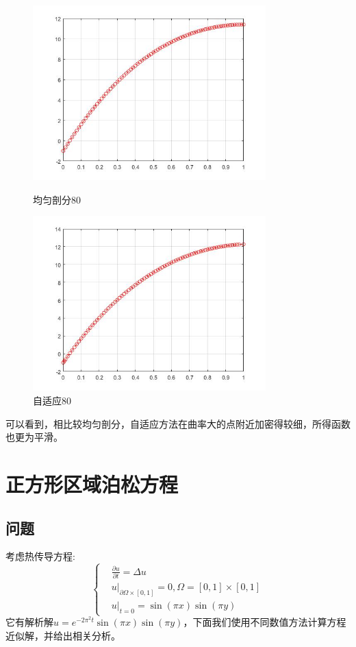 \documentclass[12pt]{ctexart}
\begin{document}
\begin{figure}[H]
	\centering
	\begin{minipage}[t]{0.48\textwidth}
		\centering
		\includegraphics[width=9cm]{方程三，均匀剖分80.jpg}
		\caption{均匀剖分80}
	\end{minipage}
	\begin{minipage}[t]{0.48\textwidth}
		\centering
		\includegraphics[width=9cm]{方程三，自适应80.jpg}
		\caption{自适应80}
	\end{minipage}
\end{figure}
可以看到，相比较均匀剖分，自适应方法在曲率大的点附近加密得较细，所得函数也更为平滑。
\section{正方形区域泊松方程}
\subsection{问题}
考虑热传导方程:
$$
\left\{
\begin{aligned}
&\frac{\partial u}{\partial t} = \Delta u\\
&u|_{\partial \Omega\times[0,1]} = 0, \Omega = [0,1]\times [0,1]\\
&u|_{t=0}=\sin(\pi x)\sin(\pi y)
\end{aligned}
\right.
$$
它有解析解$u = e^{-2\pi^2t}\sin(\pi x)\sin(\pi y)$，下面我们使用不同数值方法计算方程近似解，并给出相关分析。
\end{document}
